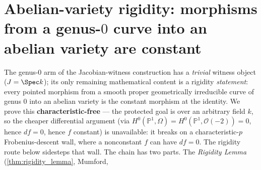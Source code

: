\chapter{Abelian-variety rigidity: morphisms from a genus-\(0\) curve into an abelian variety are constant}
\label{chap:AbelianVarietyRigidity}
\label{chap:avr_for_rr}
\providecommand{\fatsemi}{\mathbin{\,;\,}}
The genus-\(0\) arm of the Jacobian-witness construction has a \emph{trivial} witness object
(\(J = \Spec k\)); its only remaining mathematical content is a rigidity \emph{statement}:
every pointed morphism from a smooth proper geometrically irreducible curve of genus \(0\)
into an abelian variety is the constant morphism at the identity. We prove this
\textbf{characteristic-free} --- the protected goal is over an arbitrary field \(k\), so the
cheaper differential argument (via \(H^0(\mathbb P^1, \Omega) = H^0(\mathbb P^1, \mathcal
O(-2)) = 0\), hence \(df = 0\), hence \(f\) constant) is unavailable: it breaks on a
characteristic-\(p\) Frobenius-descent wall, where a nonconstant \(f\) can have \(df = 0\). The
rigidity route below sidesteps that wall.
The chain has two parts. The \emph{Rigidity Lemma} (\cref{thm:rigidity_lemma}, Mumford,
